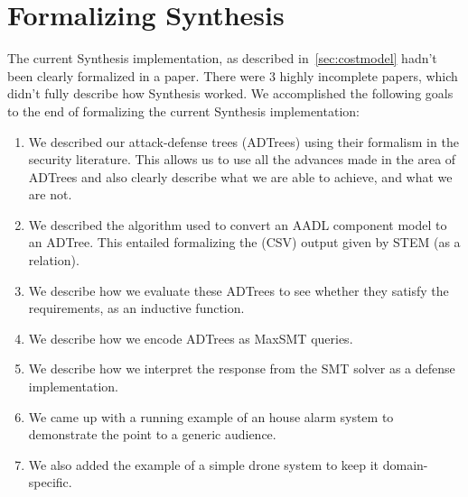 \documentclass{article}
\begin{document}
\section{Formalizing Synthesis}
	The current Synthesis implementation, as
	described in~\ref{sec:costmodel} hadn't 
	been clearly formalized in a paper. There 
	were 3 highly incomplete papers, which 
	didn't fully describe how Synthesis 
	worked. We accomplished the following goals
	to the end of formalizing the current 
	Synthesis implementation:
	\begin{enumerate}
		\item We described our attack-defense
		trees (ADTrees) using their formalism 
		in the security literature.
		This allows us to use all the advances
		made in the area of ADTrees
		and also clearly describe what we are
		able to achieve, and what we are not.
		\item We described the algorithm used 
		to convert an AADL component model to 
		an ADTree. This entailed formalizing 
		the (CSV) output given by STEM (as a 
		relation).
		\item We describe how we evaluate these 
		ADTrees to see whether 
		they satisfy the requirements, as an 
		inductive function.
		\item We describe how we encode ADTrees
		as MaxSMT queries. 
		\item We describe how we interpret the 
		response from the SMT solver as a 
		defense implementation.
		\item We came up with a running example of 
		an house alarm system to demonstrate the 
		point to a generic audience.
		\item We also added the example of a 
		simple drone system to keep it 
		domain-specific.
	\end{enumerate}
\end{document}
